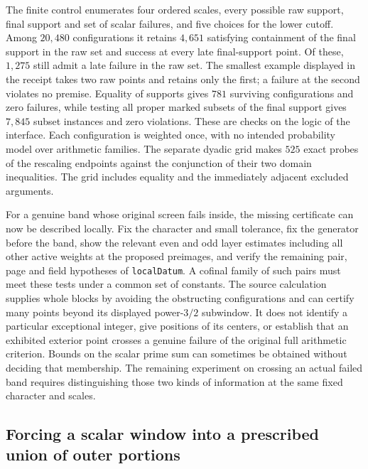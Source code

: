 \documentclass[12pt,letterpaper]{article}
\begin{document}
The finite control enumerates four ordered scales, every possible raw support, final support and set of scalar failures, and five choices for the lower cutoff. Among \(20{,}480\) configurations it retains \(4{,}651\) satisfying containment of the final support in the raw set and success at every late final-support point. Of these, \(1{,}275\) still admit a late failure in the raw set. The smallest example displayed in the receipt takes two raw points and retains only the first; a failure at the second violates no premise. Equality of supports gives \(781\) surviving configurations and zero failures, while testing all proper marked subsets of the final support gives \(7{,}845\) subset instances and zero violations. These are checks on the logic of the interface. Each configuration is weighted once, with no intended probability model over arithmetic families. The separate dyadic grid makes \(525\) exact probes of the rescaling endpoints against the conjunction of their two domain inequalities. The grid includes equality and the immediately adjacent excluded arguments.

For a genuine band whose original screen fails inside, the missing certificate can now be described locally. Fix the character and small tolerance, fix the generator before the band, show the relevant even and odd layer estimates including all other active weights at the proposed preimages, and verify the remaining pair, page and field hypotheses of \texttt{localDatum}. A cofinal family of such pairs must meet these tests under a common set of constants. The source calculation supplies whole blocks by avoiding the obstructing configurations and can certify many points beyond its displayed power-\(3/2\) subwindow. It does not identify a particular exceptional integer, give positions of its centers, or establish that an exhibited exterior point crosses a genuine failure of the original full arithmetic criterion. Bounds on the scalar prime sum can sometimes be obtained without deciding that membership. The remaining experiment on crossing an actual failed band requires distinguishing those two kinds of information at the same fixed character and scales.

\subsection{Forcing a scalar window into a prescribed union of outer portions}
\end{document}
